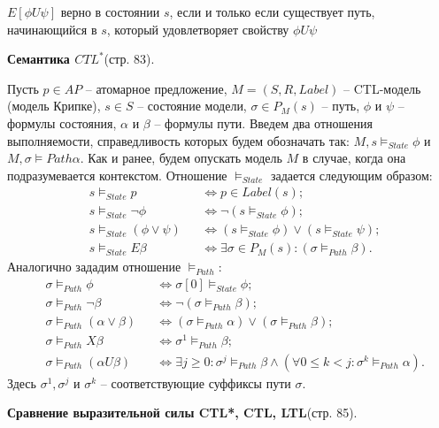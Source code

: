 \documentclass[a4paper,12pt]{article}
\begin{document}
$E[\phi U \psi]$ верно в состоянии $s$, если и только если существует путь,
начинающийся в $s$, который удовлетворяет свойству $\phi U \psi$

\textbf{Семантика $CTL^*$}(стр. 83).

Пусть $p \in AP$ -- атомарное
предложение, $M = (S, R, Label)$ -- CTL-модель (модель Крипке), $s \in S$ --
состояние модели, $\sigma \in P_M(s)$ -- путь, $\phi$ и $\psi$ -- формулы состояния, $\alpha$ и $\beta$
-- формулы пути. Введем два отношения выполняемости,
справедливость которых будем обозначать так: $M, s \vDash_{State} \phi$ и
$M, \sigma \vDash{Path} \alpha$.
Как и ранее, будем опускать модель $M$ в случае, когда она
подразумевается контекстом.
Отношение $\vDash_{State}$ задается следующим образом:
\begin{align*}
    &s\vDash_{State} p &&\Leftrightarrow p \in Label(s);\\
    &s\vDash_{State} \lnot \phi &&\Leftrightarrow \lnot (s\vDash_{State} \phi);\\
    &s\vDash_{State} (\phi \vee \psi) &&\Leftrightarrow (s\vDash_{State} \phi) \vee (s\vDash_{State} \psi);\\
    &s\vDash_{State} E \beta &&\Leftrightarrow \exists \sigma \in P_M(s): (\sigma\vDash_{Path} \beta).
\end{align*}
Аналогично зададим отношение $\vDash_{Path}$:
\begin{align*}
    &\sigma \vDash_{Path} \phi &&\Leftrightarrow \sigma[0]\vDash_{State} \phi;\\
    &\sigma \vDash_{Path} \lnot \beta &&\Leftrightarrow \lnot (\sigma\vDash_{Path} \beta);\\
    &\sigma \vDash_{Path} (\alpha \vee \beta) &&\Leftrightarrow (\sigma\vDash_{Path} \alpha) \vee (\sigma\vDash_{Path} \beta);\\
    &\sigma \vDash_{Path} X \beta &&\Leftrightarrow \sigma^1\vDash_{Path} \beta;\\
    &\sigma \vDash_{Path} (\alpha U \beta) &&\Leftrightarrow \exists j \ge 0: \sigma^j\vDash_{Path} \beta \wedge (\forall 0 \le k < j: \sigma^k\vDash_{Path} \alpha).
\end{align*}
Здесь $\sigma^1, \sigma^j$ и $\sigma^k$ -- соответствующие суффиксы пути $\sigma$.

\textbf{Сравнение выразительной силы CTL*, CTL, LTL}(стр. 85).
\end{document}
